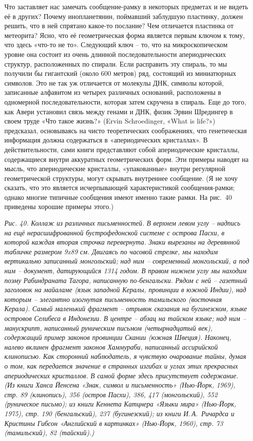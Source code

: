 \documentclass[../main.tex]{subfiles}
\begin{document}
Что заставляет нас замечать сообщение-рамку в некоторых предметах и не видеть её в других? Почему инопланетянин, поймавший заблудшую пластинку, должен решить, что в ней спрятано какое-то послание? Чем отличается пластинка от метеорита? Ясно, что её геометрическая форма является первым ключом к тому, что здесь «что-то не то». Следующий ключ \--- то, что на микроскопическом уровне она состоит из очень длинной последовательности апериодических структур, расположенных по спирали. Если расправить эту спираль, то мы получили бы гигантский (около 600 метров) ряд, состоящий из миниатюрных символов. Это не так уж отличается от молекулы ДНК, символы которой, записанные алфавитом из четырех различных оснований, расположены в одномерной последовательности, которая затем скручена в спираль. Еще до того, как Авери установил связь между генами и ДНК, физик Эрвин Шредингер в своем труде «Что такое жизнь?» (Ervin Schroedinger, «What is life?») предсказал, основываясь на чисто теоретических соображениях, что генетическая информация должна содержаться в «апериодических кристаллах». В действительности, сами книги представляют собой апериодические кристаллы, содержащиеся внутри аккуратных геометрических форм. Эти примеры наводят на мысль, что апериодические кристаллы, «упакованные» внутри регулярной геометрической структуры, могут скрывать внутреннее сообщение. (Я не хочу сказать, что это является исчерпывающей характеристикой сообщения-рамки; однако многие типичные сообщения имеют именно такие рамки. На рис.~40 приведены хорошие примеры этого.)

\emph{Рис. 40. Коллаж из различных письменностей. В верхнем левом углу \--- надпись на ещё нерасшифрованной бустрофедонской системе с острова Пасхи, в которой каждая вторая строчка перевернута. Знаки вырезаны на деревянной табличке размером 9x89 см. Двигаясь по часовой стрелке, мы находим вертикально записанный монгольский; над ним \--- современный монгольский, а под ним \--- документ, датирующийся 1314 годом. В правом нижнем углу мы находим поэму Рабиндраната Тагора, написанную по-бенгальски. Рядом с ней \--- газетный заголовок на майаламе (язык западной Кералы, провинции в южной Индии), над которым \--- элегантно изогнутая письменность тамильского (восточная Керала). Самый маленький фрагмент \--- отрывок сказания на бугинезском, языке островов Селибеса в Индонезии. В центре \--- абзац на тайском языке; над ним \--- манускрипт, написанный руническим письмом (четырнадцатый век), содержащий пример законов провинции Скании (южная Швеция). Наконец, налево вклинен фрагмент законов Хаммураби, написанный ассирийской клинописью. Как сторонний наблюдатель, я чувствую очарование тайны, думая о том, как передается значение в странных изгибах и углах этих прекрасных апериодических кристаллов. В самой форме здесь присутствует содержание. (Из книги Ханса Йенсена «Знак, символ и письменность» (Нью-Йорк, 1969), стр. 89 (клинопись), 356 (остров Пасхи), 386, 417 (монгольский), 552 (руническое письмо); из книги Кеннета Катцнера «Языки мира» (Нью-Йорк, 1975), стр. 190 (бенгальский), 237 (бугинезский); из книги И.\,А.~Ричардса и Кристины Гибсон «Английский в картинках» (Нью-Йорк, 1960), стр. 73 (тамильский), 82 (тайский).)}
\end{document}
